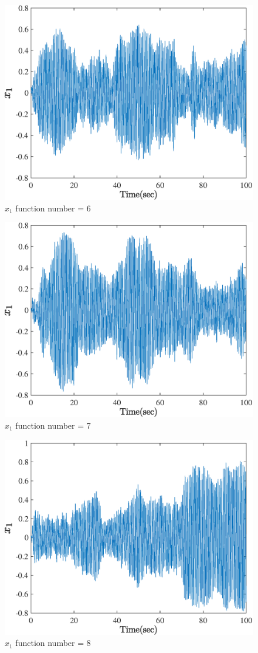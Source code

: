   \begin{figure}[H] 
  	\caption{$x_1$ function number = 6} 
  	\centering 
  	\includegraphics[width=12cm]{../Figure/Q5/part_a/6} 
  \end{figure}
  \begin{figure}[H] 
  	\caption{$x_1$ function number = 7} 
  	\centering 
  	\includegraphics[width=12cm]{../Figure/Q5/part_a/7} 
  \end{figure}
  \begin{figure}[H] 
  	\caption{$x_1$ function number = 8} 
  	\centering 
  	\includegraphics[width=12cm]{../Figure/Q5/part_a/8} 
  \end{figure}
